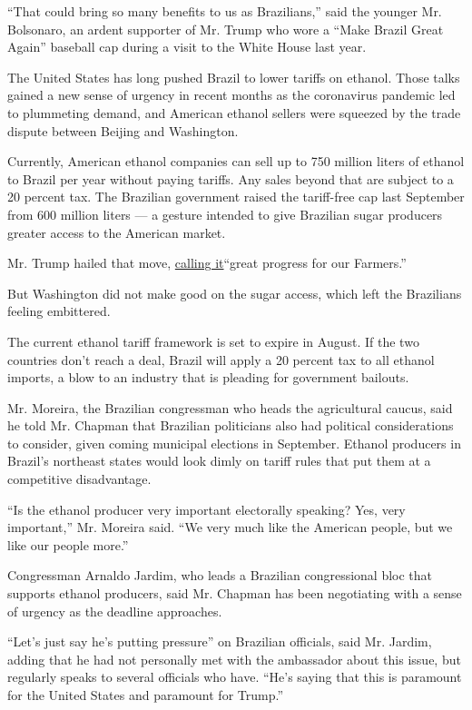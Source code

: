 ``That could bring so many benefits to us as Brazilians,'' said the
younger Mr. Bolsonaro, an ardent supporter of Mr. Trump who wore a
``Make Brazil Great Again'' baseball cap during a visit to the White
House last year.

The United States has long pushed Brazil to lower tariffs on ethanol.
Those talks gained a new sense of urgency in recent months as the
coronavirus pandemic led to plummeting demand, and American ethanol
sellers were squeezed by the trade dispute between Beijing and
Washington.

Currently, American ethanol companies can sell up to 750 million liters
of ethanol to Brazil per year without paying tariffs. Any sales beyond
that are subject to a 20 percent tax. The Brazilian government raised
the tariff-free cap last September from 600 million liters --- a gesture
intended to give Brazilian sugar producers greater access to the
American market.

Mr. Trump hailed that move,
\href{https://twitter.com/realdonaldtrump/status/1168714708691632129}{calling
it}``great progress for our Farmers.''

But Washington did not make good on the sugar access, which left the
Brazilians feeling embittered.

The current ethanol tariff framework is set to expire in August. If the
two countries don't reach a deal, Brazil will apply a 20 percent tax to
all ethanol imports, a blow to an industry that is pleading for
government bailouts.

Mr. Moreira, the Brazilian congressman who heads the agricultural
caucus, said he told Mr. Chapman that Brazilian politicians also had
political considerations to consider, given coming municipal elections
in September. Ethanol producers in Brazil's northeast states would look
dimly on tariff rules that put them at a competitive disadvantage.

``Is the ethanol producer very important electorally speaking? Yes, very
important,'' Mr. Moreira said. ``We very much like the American people,
but we like our people more.''

Congressman Arnaldo Jardim, who leads a Brazilian congressional bloc
that supports ethanol producers, said Mr. Chapman has been negotiating
with a sense of urgency as the deadline approaches.

``Let's just say he's putting pressure'' on Brazilian officials, said
Mr. Jardim, adding that he had not personally met with the ambassador
about this issue, but regularly speaks to several officials who have.
``He's saying that this is paramount for the United States and paramount
for Trump.''

